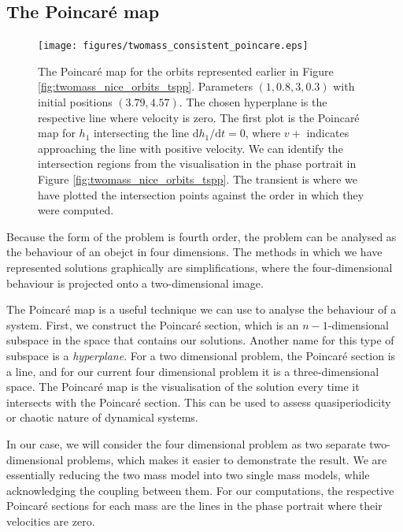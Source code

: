 \documentclass{report}
\begin{document}
\subsection{The Poincar\'e map}

\begin{figure}
    \centering
    \texttt{[image: figures/twomass\_consistent\_poincare.eps]}
    \caption{
        The Poincar\'e map for the orbits represented earlier in Figure \ref{fig:twomass_nice_orbits_tspp}.
        Parameters \((1, 0.8, 3, 0.3)\) with initial positions \((3.79,4.57)\).
        The chosen hyperplane is the respective line where velocity is zero.
        The first plot is the Poincar\'e map for $h_1$ intersecting the line $\mathrm{d}h_1/\mathrm{d}t = 0$,
        where $v+$ indicates approaching the line with positive velocity.
        We can identify the intersection regions from the visualisation in the phase portrait in Figure \ref{fig:twomass_nice_orbits_tspp}.
        The transient is where we have plotted the intersection points against the order in which they were computed.
    }
    \label{fig:twomass_poincare_nice}
\end{figure}

Because the form of the problem is fourth order,
the problem can be analysed as the behaviour of an obejct in four dimensions.
The methods in which we have represented solutions graphically are simplifications,
where the four-dimensional behaviour is projected onto a two-dimensional image.

The Poincar\'e map is a useful technique we can use to analyse the behaviour of a system.
First, we construct the Poincar\'e section,
which is an $n-1$-dimensional subspace in the space that contains our solutions.
Another name for this type of subspace is a \textit{hyperplane}.
For a two dimensional problem, the Poincar\'e section is a line,
and for our current four dimensional problem it is a three-dimensional space.
The Poincar\'e map is the visualisation of the solution every time it intersects with the Poincar\'e section.
This can be used to assess quasiperiodicity or chaotic nature of dynamical systems.

In our case, we will consider the four dimensional problem as two separate two-dimensional problems,
which makes it easier to demonstrate the result.
We are essentially reducing the two mass model into two single mass models,
while acknowledging the coupling between them.
For our computations, the respective Poincar\'e sections for each mass are the lines in the phase portrait where their velocities are zero.
\end{document}
